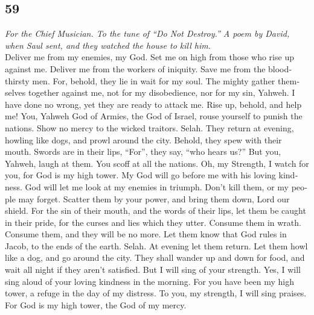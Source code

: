 \begin{paracol}{2}
\switchcolumn
\begin{otherlanguage}{english}

\hypertarget{section-117}{%
\section{59}\label{section-117}}

\emph{For the Chief Musician. To the tune of ``Do Not Destroy.'' A poem
by David, when Saul sent, and they watched the house to kill him.}\\
 Deliver me from my enemies, my God. Set me on high from
those who rise up against me.  Deliver me from the workers
of iniquity. Save me from the bloodthirsty men.  For,
behold, they lie in wait for my soul. The mighty gather themselves
together against me, not for my disobedience, nor for my sin, Yahweh.
 I have done no wrong, yet they are ready to attack me.
Rise up, behold, and help me!  You, Yahweh God of Armies,
the God of Israel, rouse yourself to punish the nations. Show no mercy
to the wicked traitors. Selah.  They return at evening,
howling like dogs, and prowl around the city.  Behold,
they spew with their mouth. Swords are in their lips, ``For'', they say,
``who hears us?''  But you, Yahweh, laugh at them. You
scoff at all the nations.  Oh, my Strength, I watch for
you, for God is my high tower.  My God will go before me
with his loving kindness. God will let me look at my enemies in triumph.
 Don't kill them, or my people may forget. Scatter them
by your power, and bring them down, Lord our shield.  For
the sin of their mouth, and the words of their lips, let them be caught
in their pride, for the curses and lies which they utter.
 Consume them in wrath. Consume them, and they will be no
more. Let them know that God rules in Jacob, to the ends of the earth.
Selah.  At evening let them return. Let them howl like a
dog, and go around the city.  They shall wander up and
down for food, and wait all night if they aren't satisfied.
 But I will sing of your strength. Yes, I will sing aloud
of your loving kindness in the morning. For you have been my high tower,
a refuge in the day of my distress.  To you, my strength,
I will sing praises. For God is my high tower, the God of my mercy.

\end{otherlanguage}


\end{paracol}
